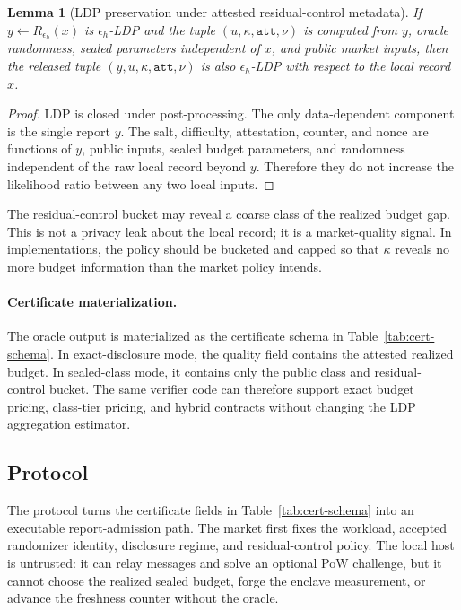 \documentclass[conference]{IEEEtran}
\newtheorem{lemma}{Lemma}[section]
\newcommand{\eps}{\epsilon}
\begin{document}
\begin{lemma}[LDP preservation under attested residual-control metadata]
\label{lem:postprocess}
If $y\leftarrow R_{\eps_h}(x)$ is $\eps_h$-LDP and the tuple $(u,\kappa,\texttt{att},\nu)$ is computed from $y$, oracle randomness, sealed parameters independent of $x$, and public market inputs, then the released tuple $(y,u,\kappa,\texttt{att},\nu)$ is also $\eps_h$-LDP with respect to the local record $x$.
\end{lemma}

\begin{proof}
LDP is closed under post-processing. The only data-dependent component is the single report $y$. The salt, difficulty, attestation, counter, and nonce are functions of $y$, public inputs, sealed budget parameters, and randomness independent of the raw local record beyond $y$. Therefore they do not increase the likelihood ratio between any two local inputs.
\end{proof}

The residual-control bucket may reveal a coarse class of the realized budget gap. This is not a privacy leak about the local record; it is a market-quality signal. In implementations, the policy should be bucketed and capped so that $\kappa$ reveals no more budget information than the market policy intends.


\paragraph{Certificate materialization.}
The oracle output is materialized as the certificate schema in Table~\ref{tab:cert-schema}. In exact-disclosure mode, the quality field contains the attested realized budget. In sealed-class mode, it contains only the public class and residual-control bucket. The same verifier code can therefore support exact budget pricing, class-tier pricing, and hybrid contracts without changing the LDP aggregation estimator.

\subsection{Protocol}

The protocol turns the certificate fields in Table~\ref{tab:cert-schema} into an executable report-admission path. The market first fixes the workload, accepted randomizer identity, disclosure regime, and residual-control policy. The local host is untrusted: it can relay messages and solve an optional PoW challenge, but it cannot choose the realized sealed budget, forge the enclave measurement, or advance the freshness counter without the oracle.
\end{document}
